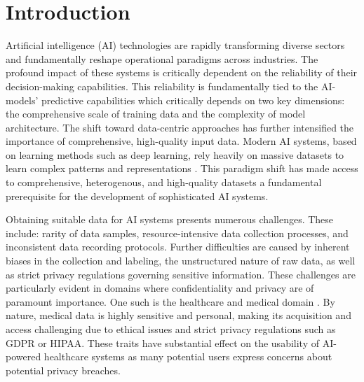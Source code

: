 \documentclass[runningheads]{llncs}
\begin{document}
\section{Introduction}

Artificial intelligence (AI) technologies are rapidly transforming diverse sectors and fundamentally reshape operational paradigms across industries. The profound impact of these systems is critically dependent on the reliability of their decision-making capabilities. This reliability is fundamentally tied to the AI-models' predictive capabilities which critically depends on two key dimensions: the comprehensive scale of training data and the complexity of model architecture. The shift toward data-centric approaches \cite{EffectivenessData} has further intensified the importance of comprehensive, high-quality input data. Modern AI systems, based on learning methods such as deep learning, rely heavily on massive datasets to learn complex patterns and representations \cite{sutton2019}. This paradigm shift has made access to comprehensive, heterogenous, and high-quality datasets a fundamental prerequisite for the development of sophisticated AI systems.

Obtaining suitable data for AI systems presents numerous challenges. These include: rarity of data samples, resource-intensive data collection processes, and inconsistent data recording protocols. Further difficulties are caused by inherent biases in the collection and labeling, the unstructured nature of raw data, as well as strict privacy regulations governing sensitive information. These challenges are particularly evident in domains where confidentiality and privacy are of paramount importance. One such is the healthcare and medical domain \cite{app13127082}. By nature, medical data is highly sensitive and personal, making its acquisition and access challenging due to ethical issues and strict privacy regulations such as GDPR or HIPAA. These traits have substantial effect on the usability of AI-powered healthcare systems as many potential users express concerns about potential privacy breaches\cite{TrustinandAcceptanceofArtificialIntelligenceApplicationsinMedicine:MixedMethodsStudy}. 
\end{document}
